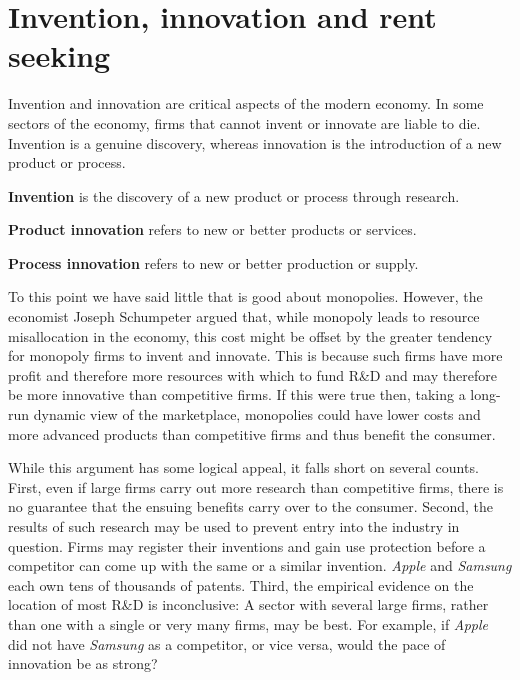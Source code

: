 \section{Invention, innovation and rent seeking}\label{sec:ch10sec7}

Invention and innovation are critical aspects of the modern economy. In 
some sectors of the economy, firms that cannot invent or innovate are 
liable to die. Invention is a genuine discovery, whereas innovation is 
the introduction of a new product or process. 

\begin{DefBox}
\textbf{Invention} is the discovery of a new product or process through research.

\textbf{Product innovation} refers to new or better products or services.

\textbf{Process innovation} refers to new or better production or supply.
\end{DefBox}

To this point we have said little that is good about monopolies. However, 
the economist Joseph Schumpeter argued that, while monopoly leads to 
resource misallocation in the economy, this cost might be offset by the 
greater tendency for monopoly firms to invent and innovate. This is 
because such firms have more profit and therefore more resources with 
which to fund R\&D and may therefore be more innovative than competitive 
firms. If this were true then, taking a long-run dynamic view of the 
marketplace, monopolies could have lower costs and more advanced products 
than competitive firms and thus benefit the consumer.

While this argument has some logical appeal, it falls short on several 
counts. First, even if large firms carry out more research than competitive 
firms, there is no guarantee that the ensuing benefits carry over to the 
consumer. Second, the results of such research may be used to prevent entry 
into the industry in question. Firms may register their inventions and 
gain use protection before a competitor can come up with the same or a 
similar invention. \textit{Apple} and \textit{Samsung} each own tens of thousands of patents. 
Third, the empirical evidence on the location of most R\&D is inconclusive: 
A sector with several large firms, rather than one with a single or very 
many firms, may be best. For example, if \textit{Apple} did not have \textit{Samsung} as a 
competitor, or vice versa, would the pace of innovation be as strong? 

